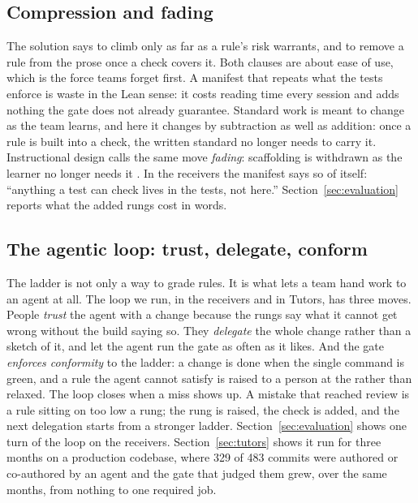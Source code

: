 \subsection{Compression and fading}

The solution says to climb only as far as a rule's risk warrants, and to remove a rule from the
prose once a check covers it. Both clauses are about ease of use, which is the force teams
forget first. A manifest that repeats what the tests enforce is waste in the Lean sense: it costs
reading time every session and adds nothing the gate does not already guarantee. Standard work
is meant to change as the team learns, and here it changes by subtraction as well as addition:
once a rule is built into a check, the written standard no longer needs to carry it. Instructional
design calls the same move \emph{fading}: scaffolding is withdrawn as the learner no longer needs
it \citep{wood1976scaffolding}. In the receivers the manifest says so of itself: ``anything a
test can check lives in the tests, not here.'' Section~\ref{sec:evaluation} reports what the
added rungs cost in words.

\subsection{The agentic loop: trust, delegate, conform}

The ladder is not only a way to grade rules. It is what lets a team hand work to an agent at
all. The loop we run, in the receivers and in Tutors, has three moves. People \emph{trust} the
agent with a change because the rungs say what it cannot get wrong without the build saying so.
They \emph{delegate} the whole change rather than a sketch of it, and let the agent run the gate
as often as it likes. And the gate \emph{enforces conformity} to the ladder: a change is done
when the single command is green, and a rule the agent cannot satisfy is raised to a person at
the  rather than relaxed. The loop closes when a miss shows up. A
mistake that reached review is a rule sitting on too low a rung; the rung is raised, the check is
added, and the next delegation starts from a stronger ladder. Section~\ref{sec:evaluation}
shows one turn of the loop on the receivers. Section~\ref{sec:tutors} shows it run for three
months on a production codebase, where 329 of 483 commits were authored or co-authored by an
agent and the gate that judged them grew, over the same months, from nothing to one required
job.
